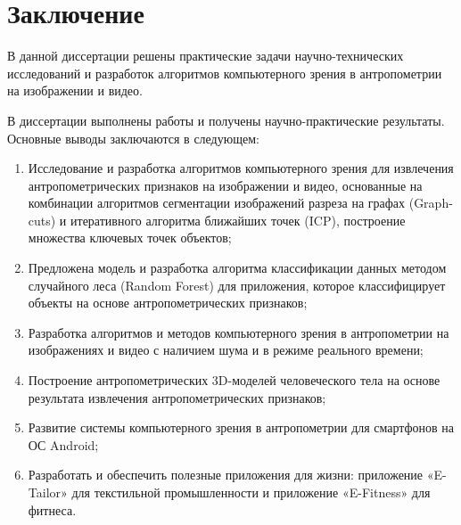 \chapter*{Заключение}
В данной диссертации решены практические задачи научно-технических исследований и разработок алгоритмов компьютерного зрения в антропометрии на изображении и видео.

В диссертации выполнены работы и получены научно-практические результаты. Основные выводы заключаются в следующем:

\begin{enumerate}
	\item Исследование и разработка алгоритмов компьютерного зрения для  извлечения антропометрических признаков на изображении и видео, основанные на комбинации алгоритмов сегментации изображений разреза на графах (Graph-cuts) и итеративного алгоритма ближайших точек (ICP), построение множества ключевых точек объектов;
	\item Предложена модель и разработка алгоритма классификации данных методом случайного леса (Random Forest) для приложения, которое классифицирует объекты на основе антропометрических признаков;
	\item Разработка алгоритмов и методов компьютерного зрения в антропометрии на изображениях и видео с наличием шума и в режиме реального времени;
	\item Построение антропометрических 3D-моделей человеческого тела на основе результата извлечения антропометрических признаков;
	\item Развитие системы компьютерного зрения в антропометрии для смартфонов на ОС Android;
	\item Разработать и обеспечить полезные приложения для жизни: приложение «E-Tailor» для текстильной промышленности и приложение «E-Fitness» для фитнеса.
\end{enumerate}



